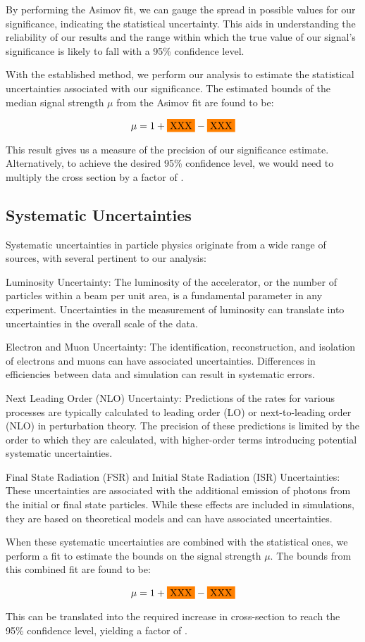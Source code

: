 By performing the Asimov fit, we can gauge the spread in possible values for our significance, indicating the
statistical uncertainty. This aids in understanding the reliability of our results and the range within which the true
value of our signal's significance is likely to fall with a 95\% confidence level.

With the established method, we perform our analysis to estimate the statistical uncertainties associated with our
significance. The estimated bounds of the median signal strength $\mu$ from the Asimov fit are found to be:

$$
    \mu = 1 + \placeholder{XXX} - \placeholder{XXX}
$$

This result gives us a measure of the precision of our significance estimate.
Alternatively, to achieve the desired 95\% confidence level, we would need to multiply the cross section by a factor of
.

\subsection{Systematic Uncertainties}

Systematic uncertainties in particle physics originate from a wide range of sources, with several pertinent to our
analysis:

Luminosity Uncertainty: The luminosity of the accelerator, or the number of particles within a beam per unit area, is a
fundamental parameter in any experiment. Uncertainties in the measurement of luminosity can translate into uncertainties
in the overall scale of the data.

Electron and Muon Uncertainty: The identification, reconstruction, and isolation of electrons and muons can have
associated uncertainties. Differences in efficiencies between data and simulation can result in systematic errors.

Next Leading Order (NLO) Uncertainty: Predictions of the rates for various processes are typically calculated to leading
order (LO) or next-to-leading order (NLO) in perturbation theory. The precision of these predictions is limited by the
order to which they are calculated, with higher-order terms introducing potential systematic uncertainties.

Final State Radiation (FSR) and Initial State Radiation (ISR) Uncertainties: These uncertainties are associated with the
additional emission of photons from the initial or final state particles. While these effects are included in
simulations, they are based on theoretical models and can have associated uncertainties.

When these systematic uncertainties are combined with the statistical ones, we perform a fit to estimate the bounds on
the signal strength $\mu$. The bounds from this combined fit are found to be:

$$
    \mu = 1 + \placeholder{XXX} - \placeholder{XXX}
$$

This can be translated into the required increase in cross-section to reach the 95\% confidence
level, yielding a factor of .